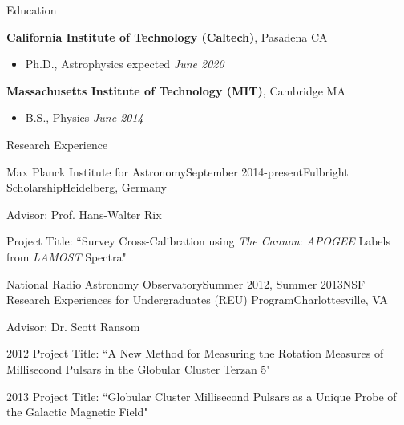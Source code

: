 \documentclass{resume} %
\begin{document}

\begin{rSection}{Education}

{\bf California Institute of Technology (Caltech)}, Pasadena CA
\begin{itemize}
\item Ph.D., Astrophysics \hfill expected {\em June 2020} 
\end{itemize}

{\bf Massachusetts Institute of Technology (MIT)}, Cambridge MA
\begin{itemize}
\item B.S., Physics \hfill {\em June 2014} 
\end{itemize}

\end{rSection}


\begin{rSection}{Research Experience}

\begin{rSubsection}{Max Planck Institute for Astronomy}{September 2014-present}{Fulbright Scholarship}{Heidelberg, Germany}
\item Advisor: Prof. Hans-Walter Rix
\item Project Title: ``Survey Cross-Calibration using {\em The Cannon}: {\em APOGEE} Labels from {\em LAMOST} Spectra"
\end{rSubsection}

\begin{rSubsection}{National Radio Astronomy Observatory}{Summer 2012, Summer 2013}{NSF Research Experiences for Undergraduates (REU) Program}{Charlottesville, VA}
\item Advisor: Dr. Scott Ransom
\item 2012 Project Title: ``A New Method for Measuring the Rotation Measures of Millisecond Pulsars in the Globular Cluster Terzan 5"
\item 2013 Project Title: ``Globular Cluster Millisecond Pulsars as a Unique Probe of the Galactic Magnetic Field"
\end{rSubsection}

\end{rSection}
\end{document}
